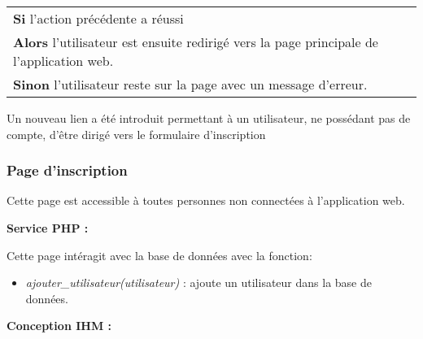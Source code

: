             \begin{center}
                \begin{tabular}{l}
                    \textbf{Si} l'action précédente a réussi \\
                    \textbf{Alors} l'utilisateur est ensuite redirigé vers la page principale de l'application web. \\
                    \textbf{Sinon} l'utilisateur reste sur la page avec un message d'erreur.
                \end{tabular}
            \end{center}


        \newpage
        
            \begin{paragraphe}
                Un nouveau lien a été introduit permettant à un utilisateur, ne possédant pas de compte, d'être dirigé vers le formulaire d'inscription
            \end{paragraphe}


    \clearpage

		\subsubsection{Page d'inscription}

			\begin{paragraphe}
				Cette page est accessible à toutes personnes non connectées à l'application web.
			\end{paragraphe}

			\begin{paragraphe}
				\textbf{Service PHP :}
			\end{paragraphe}

			\begin{paragraphe}
			    Cette page intéragit avec la base de données avec la fonction:
				\begin{itemize}
					\item \emph{ajouter\_utilisateur(utilisateur)} : ajoute un utilisateur dans la base de données.
				\end{itemize}
			\end{paragraphe}

			\begin{paragraphe}
				\textbf{Conception IHM :}
			\end{paragraphe}


